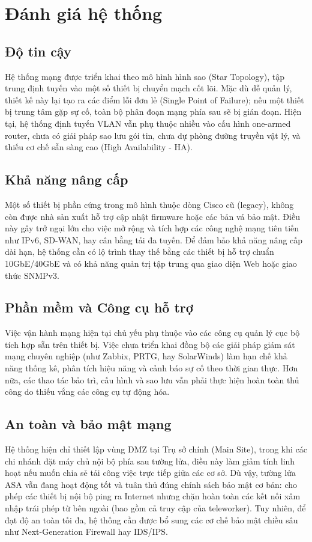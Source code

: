 \section{Đánh giá hệ thống}

\subsection{Độ tin cậy}
Hệ thống mạng được triển khai theo mô hình hình sao (Star Topology), tập trung định tuyến vào một số thiết bị chuyển mạch cốt lõi. Mặc dù dễ quản lý, thiết kế này lại tạo ra các điểm lỗi đơn lẻ (Single Point of Failure); nếu một thiết bị trung tâm gặp sự cố, toàn bộ phân đoạn mạng phía sau sẽ bị gián đoạn. Hiện tại, hệ thống định tuyến VLAN vẫn phụ thuộc nhiều vào cấu hình one-armed router, chưa có giải pháp sao lưu gói tin, chưa dự phòng đường truyền vật lý, và thiếu cơ chế sẵn sàng cao (High Availability - HA).

\subsection{Khả năng nâng cấp}
Một số thiết bị phần cứng trong mô hình thuộc dòng Cisco cũ (legacy), không còn được nhà sản xuất hỗ trợ cập nhật firmware hoặc các bản vá bảo mật. Điều này gây trở ngại lớn cho việc mở rộng và tích hợp các công nghệ mạng tiên tiến như IPv6, SD-WAN, hay cân bằng tải đa tuyến. Để đảm bảo khả năng nâng cấp dài hạn, hệ thống cần có lộ trình thay thế bằng các thiết bị hỗ trợ chuẩn 10GbE/40GbE và có khả năng quản trị tập trung qua giao diện Web hoặc giao thức SNMPv3.

\subsection{Phần mềm và Công cụ hỗ trợ}
Việc vận hành mạng hiện tại chủ yếu phụ thuộc vào các công cụ quản lý cục bộ tích hợp sẵn trên thiết bị. Việc chưa triển khai đồng bộ các giải pháp giám sát mạng chuyên nghiệp (như Zabbix, PRTG, hay SolarWinds) làm hạn chế khả năng thống kê, phân tích hiệu năng và cảnh báo sự cố theo thời gian thực. Hơn nữa, các thao tác bảo trì, cấu hình và sao lưu vẫn phải thực hiện hoàn toàn thủ công do thiếu vắng các công cụ tự động hóa.

\subsection{An toàn và bảo mật mạng}
Hệ thống hiện chỉ thiết lập vùng DMZ tại Trụ sở chính (Main Site), trong khi các chi nhánh đặt máy chủ nội bộ phía sau tường lửa, điều này làm giảm tính linh hoạt nếu muốn chia sẻ tải công việc trực tiếp giữa các cơ sở. Dù vậy, tường lửa ASA vẫn đang hoạt động tốt và tuân thủ đúng chính sách bảo mật cơ bản: cho phép các thiết bị nội bộ ping ra Internet nhưng chặn hoàn toàn các kết nối xâm nhập trái phép từ bên ngoài (bao gồm cả truy cập của teleworker). Tuy nhiên, để đạt độ an toàn tối đa, hệ thống cần được bổ sung các cơ chế bảo mật chiều sâu như Next-Generation Firewall hay IDS/IPS.


